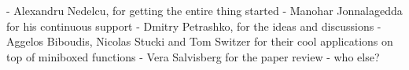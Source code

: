 - Alexandru Nedelcu, for getting the entire thing started
 - Manohar Jonnalagedda for his continuous support
 - Dmitry Petrashko, for the ideas and discussions
 - Aggelos Biboudis, Nicolas Stucki and Tom Switzer for their cool applications on top of miniboxed functions
 - Vera Salvisberg for the paper review
 - who else?